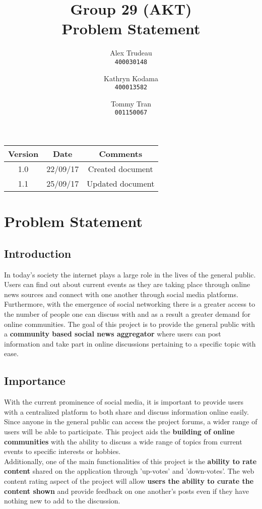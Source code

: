 \documentclass[12pt,fleqn]{article}
\title{Group 29 (AKT)\\ Problem Statement}
\author{
Alex Trudeau\\
	\texttt{400030148}
\and
Kathryn Kodama\\
  	\texttt{400013582}
\and
Tommy Tran\\
	\texttt{001150067}
}
\begin{document}
\maketitle

\begin{center}

\begin{tabular}{ |c| c| c| }
\hline
Version & Date & Comments \\
\hline
1.0 & 22/09/17 & Created document \\
\hline
1.1 & 25/09/17 & Updated document \\
\hline
\end{tabular}
\end{center}


\pagebreak
\section {Problem Statement}

\subsection{Introduction}

In today's society the internet plays a large role in the lives of the general public. Users can find out about current events as they are taking place through online news sources and connect with one another through social media platforms.  Furthermore, with the emergence of social networking there is a greater access to the number of people one can discuss with and as a result a greater demand for online communities.  The goal of this project is to provide the general public with a \textbf{community based social news aggregator} where users can post information and take part in online discussions pertaining to a specific topic with ease.  

\subsection{Importance}

With the current prominence of social media, it is important to provide users with a centralized platform to both share and discuss information online easily.  Since anyone in the general public can access the project forums, a wider range of users will be able to participate.  This project aids the \textbf{building of online communities} with the ability to discuss a wide range of topics from current events to specific interests or hobbies. \\
\newline
Additionally, one of the main functionalities of this project is the \textbf{ability to rate content} shared on the application through 'up-votes' and 'down-votes'.  The web content rating aspect of the project will allow \textbf{users the ability to curate the content shown} and provide feedback on one another's posts even if they have nothing new to add to the discussion.  
\end{document}
